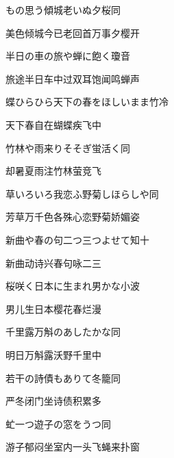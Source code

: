 \begin{haiku}
    {\FH もの思う傾城老いぬ夕桜}\hfill{\FH 同}

    {\FK 美色倾城今已老回首万事夕樱开}
\end{haiku}

\begin{haiku}
    {\FH 半日の車の旅や蝉に飽く}\hfill{\FH 瓊音}

    {\FK 旅途半日车中过双耳饱闻鸣蝉声}
\end{haiku}

\begin{haiku}
    {\FH 蝶ひらひら天下の春をほしいまま}\hfill{\FH 竹冷}

    {\FK 天下春自在蝴蝶疾飞中}
\end{haiku}

\begin{haiku}
    {\FH 竹林や雨来りそそぎ蛍活く}\hfill{\FH 同}

    {\FK 却暑夏雨注竹林萤竞飞}
\end{haiku}

\begin{haiku}
    {\FH 草いろいろ我恋ふ野菊しほらしや}\hfill{\FH 同}

    {\FK 芳草万千色各殊心恋野菊娇媚姿}
\end{haiku}

\begin{haiku}
    {\FH 新曲や春の句二つ三つよせて}\hfill{\FH 知十}

    {\FK 新曲动诗兴春句咏二三}
\end{haiku}

\begin{haiku}
    {\FH 桜咲く日本に生まれ男かな}\hfill{\FH 小波}

    {\FK 男儿生日本樱花春烂漫}
\end{haiku}

\begin{haiku}
    {\FH {}千里露万斛のあしたかな}\hfill{\FH 同}

    {\FK 明日万斛露沃野千里中}
\end{haiku}

\begin{haiku}
    {\FH 若干の詩債もありて冬籠}\hfill{\FH 同}

    {\FK 严冬闭门坐诗债积累多}
\end{haiku}

\begin{haiku}
    {\FH 虻一つ遊子の窓をうつ}\hfill{\FH 同}

    {\FK 游子郁闷坐室内一头飞蝇来扑窗}
\end{haiku}

